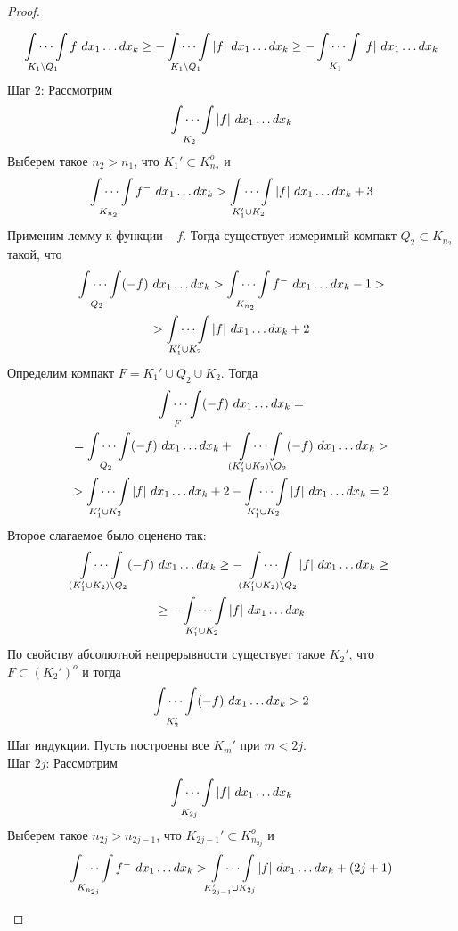 \begin{proof}
\begin{itemize}
        \[\idotsint\limits_{K_1\setminus Q_1}f\ dx_1 \dots dx_k\geq -\idotsint\limits_{K_1\setminus Q_1}|f|\ dx_1 \dots dx_k\geq -\idotsint\limits_{K_1}|f|\ dx_1 \dots dx_k\]
        \underline{Шаг 2:} Рассмотрим
        \[\idotsint\limits_{K_2}|f|\ dx_1 \dots dx_k\]
        Выберем такое $n_2>n_1$, что $K_1'\subset K^o_{n_2}$ и
        \[\idotsint\limits_{K_{n_2}}f^-\ dx_1 \dots dx_k > \idotsint\limits_{K_1'\cup K_2}|f|\ dx_1\dots dx_k+3\]
        Применим лемму к функции $-f$. Тогда существует измеримый компакт $Q_2\subset K_{{n_2}}$ такой, что
        \begin{multline*}
            \idotsint\limits_{Q_2}(-f)\ dx_1 \dots dx_k > \idotsint\limits_{K_{n_2}}f^-\ dx_1 \dots dx_k -1>\\
            >\idotsint\limits_{K_1'\cup K_2}|f|\ dx_1 \dots dx_k+2
        \end{multline*}
        Определим компакт $F=K_1'\cup Q_2\cup K_2$. Тогда
        \begin{multline*}
            \idotsint\limits_{F}(-f)\ dx_1 \dots dx_k=\\
            =\idotsint\limits_{Q_2}(-f)\ dx_1 \dots dx_k+\idotsint\limits_{(K_1'\cup K_2)\setminus Q_2}(-f)\ dx_1 \dots dx_k>\\
            >\idotsint\limits_{K_1'\cup K_2}|f|\ dx_1 \dots dx_k+2-\idotsint\limits_{K_1'\cup K_2}|f|\ dx_1 \dots dx_k=2
        \end{multline*}
        Второе слагаемое было оценено так:
        \begin{multline*}
            \idotsint\limits_{(K_1'\cup K_2)\setminus Q_2}(-f)\ dx_1 \dots dx_k\geq -\idotsint\limits_{(K_1'\cup K_2)\setminus Q_2}|f|\ dx_1 \dots dx_k\geq\\
            \geq -\idotsint\limits_{K_1'\cup K_2}|f|\ dx_1 \dots dx_k
        \end{multline*}
        По свойству абсолютной непрерывности существует такое $K_2'$, что\\
        $F\subset (K_2')^o$ и тогда
        \[\idotsint\limits_{K_2'} (-f)\ dx_1 \dots dx_k>2\]
        Шаг индукции. Пусть построены все $K_m'$ при $m<2j$. \\
        \underline{Шаг $2j$:} Рассмотрим
        \[\idotsint\limits_{K_{2j}}|f|\ dx_1 \dots dx_k\]
        Выберем такое $n_{2j}>n_{2j-1}$, что $K_{2j-1}'\subset K^o_{n_{2j}}$ и
        \[\idotsint\limits_{K_{n_{2j}}}f^-\ dx_1 \dots dx_k > \idotsint\limits_{K_{2j-1}'\cup K_{2j}}|f|\ dx_1\dots dx_k+(2j+1)\]

\end{itemize}
\end{proof}
